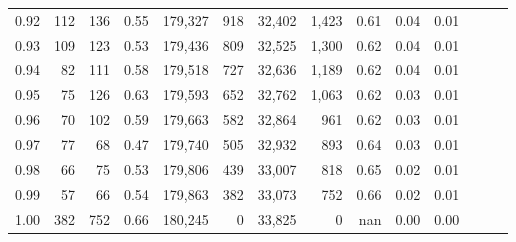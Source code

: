 \begin{tabular}{rrrrrrrrrrrrrr}
0.92 &    112 &  136 &  0.55 &  179,327 &      918 &  32,402 &   1,423 &  0.61 &  0.04 &      0.01 \\
0.93 &    109 &  123 &  0.53 &  179,436 &      809 &  32,525 &   1,300 &  0.62 &  0.04 &      0.01 \\
0.94 &     82 &  111 &  0.58 &  179,518 &      727 &  32,636 &   1,189 &  0.62 &  0.04 &      0.01 \\
0.95 &     75 &  126 &  0.63 &  179,593 &      652 &  32,762 &   1,063 &  0.62 &  0.03 &      0.01 \\
0.96 &     70 &  102 &  0.59 &  179,663 &      582 &  32,864 &     961 &  0.62 &  0.03 &      0.01 \\
0.97 &     77 &   68 &  0.47 &  179,740 &      505 &  32,932 &     893 &  0.64 &  0.03 &      0.01 \\
0.98 &     66 &   75 &  0.53 &  179,806 &      439 &  33,007 &     818 &  0.65 &  0.02 &      0.01 \\
0.99 &     57 &   66 &  0.54 &  179,863 &      382 &  33,073 &     752 &  0.66 &  0.02 &      0.01 \\
1.00 &    382 &  752 &  0.66 &  180,245 &        0 &  33,825 &       0 &   nan &  0.00 &      0.00 \\
\bottomrule
\end{tabular}
